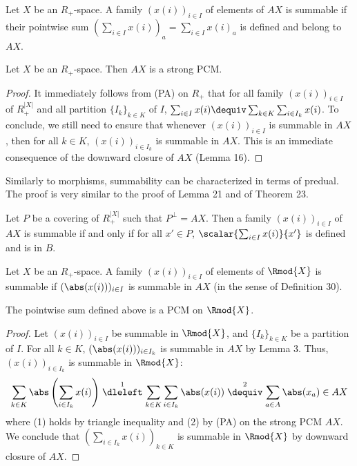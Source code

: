 \begin{originaldef}[30] Let $X$ be an $R_+$-space. A family $(x(i))_{i\in I}$ of elements of $AX$ is summable if their pointwise sum $(\sum_{i\in I}x(i))_a=\sum_{i\in I}x(i)_a$ is defined and belong to $AX$.\end{originaldef}
\begin{originalprop}[31] Let $X$ be an $R_+$-space. Then $AX$ is a strong PCM.\end{originalprop}
\begin{proof}It immediately follows from (PA) on $R_+$ that for all family $(x(i))_{i\in I}$ of $R_+^{|X|}$ and all partition $\{I_k\}_{k\in K}$ of $I$, $\sum_{i\in I}x(i)\dequiv\sum_{k\in K}\sum_{i\in I_k}x(i)$. To conclude, we still need to ensure that whenever $(x(i))_{i\in I}$ is summable in $AX$, then for all $k\in K$, $(x(i))_{i\in I_k}$ is summable in $AX$. This is an immediate consequence of the downward closure of $AX$ (Lemma 16).\end{proof}
Similarly to morphisms, summability can be characterized in terms of predual. The proof is very similar to the proof of Lemma 21 and of Theorem 23.
\begin{originalprop}[33] Let $P$ be a covering of $R_+^{|X|}$ such that $P^\perp=AX$. Then a family $(x(i))_{i\in I}$ of $AX$ is summable if and only if for all $x'\in P$, $\scalar{\sum_{i\in I}x(i)}{x'}$ is defined and is in $B$.\end{originalprop}
\begin{originaldef}[34] Let $X$ be an $R_+$-space. A family $(x(i))_{i\in I}$ of elements of $\Rmod{X}$ is summable if $(\abs(x(i)))_{i\in I}$ is summable in $AX$ (in the sense of Definition 30).\end{originaldef}
\begin{originalprop}[35] The pointwise sum defined above is a PCM on $\Rmod{X}$.\end{originalprop}
\begin{proof} Let $(x(i))_{i\in I}$ be summable in $\Rmod{X}$, and $\{I_k\}_{k\in K}$ be a partition of $I$. For all $k\in K$, $(\abs(x(i)))_{i\in I_k}$ is summable in $AX$ by Lemma 3. Thus, $(x(i))_{i\in I_k}$ is summable in $\Rmod{X}$:
\[\sum_{k\in K}\abs\left(\sum_{i\in I_k}x(i)\right)\mathrel{\stackrel{1}{\dleleft}}\sum_{k\in K}\sum_{i\in I_k}\abs(x(i))\mathrel{\stackrel{2}{\dequiv}}\sum_{a\in A}\abs(x_a)\in AX\]
where (1) holds by triangle inequality and (2) by (PA) on the strong PCM $AX$. We conclude that $(\sum_{i\in I_k}x(i))_{k\in K}$ is summable in $\Rmod{X}$ by downward closure of $AX$.\end{proof}
